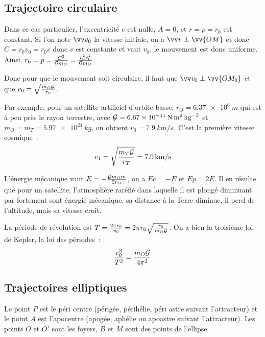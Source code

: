 \subsection{Trajectoire circulaire}%
Dans ce cas particulier, l'excentricité \(e\) est nulle, \(A=0\), et
\(r=p=r_0\) est constant. Si l'on note \(\vvv_0\) la vitesse initiale, on a
\(\vvv \perp \vv{OM}\)
et donc \(C = r_0 v_0 = r_0 v\) donc \(v\) est constante et vaut \(v_0\), le
mouvement est donc uniforme.
Ainsi, \(r_0 = p = \frac{C^2}{\mathcal{G} m_O} = \frac{r_0^2v_0^2}{\mathcal{G} m_O}\).

Donc pour que le mouvement soit circulaire, il faut que \(\vvv_0 \perp
\vv{OM_0}\) et que \(v_0 = \sqrt{\frac{m_O \mathcal{G}}{r_0}}\).%

Par exemple, pour un satellite artificiel d'orbite basse, \(r_O =
\qty{6.37e6}{m}\) qui est à peu près le rayon terrestre, avec \(\Gb = %
\qty{6.67e{-11}}{N.m^2.kg^{-2}}\) et \(m_O=m_T=\qty{5.97e24}{kg}\), on obtient
%
\(v_0 = \qty{7.9}{km/s}\). C'est la première vitesse cosmique~:
\begin{equation}%
  v_1 = \sqrt{\frac{m_T \Gb}{r_T}} = \qty{7.9}{km/s}
\end{equation}%

L'énergie mécanique vaut \(E = -\frac{\mathcal{G} m_O m}{2r_O}\), on a \(Ec=-E\) et
\(Ep = 2E\). Il en résulte que pour un satellite, l'atmosphère raréfié dans
laquelle il est plongé diminuant par fortement sont énergie mécanique, sa
distance à la Terre diminue, il perd de l'altitude, mais sa vitesse croît.

La période de révolution est \(T = \frac{2\pi r_0}{v_0} = 2\pi r_0
\sqrt{\frac{r_0}{m_O \mathcal{G}}}\). On a bien la troisième loi de Kepler, la loi des
%
périodes~:
\begin{equation}%
  \frac{r_0^3}{T^2} = \frac{m_O \Gb}{4\pi^2}
\end{equation}%

\subsection{Trajectoires elliptiques}%
Le point \(P\) est le péri centre (périgée, périhélie, péri astre suivant
l'attracteur) et le point \(A\) est l'apocentre (apogée, aphélie ou apoastre
suivant l'attracteur). Les points \(O\) et \(O'\) sont les foyers, \(B\) et
\(M\) sont des points de l'ellipse.

